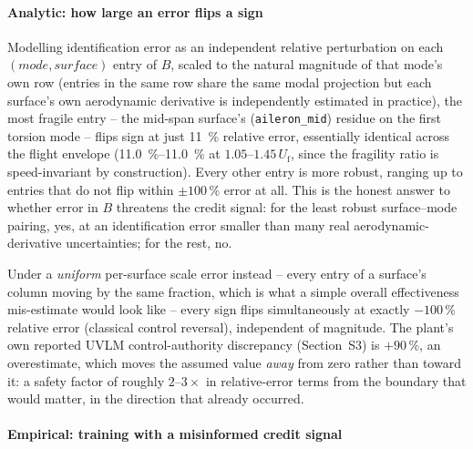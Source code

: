 \documentclass[11pt]{article}
\newcommand{\Uf}{U_{\mathrm{f}}}
\begin{document}
\paragraph{Analytic: how large an error flips a sign}
Modelling identification error as an independent relative perturbation on
each $(mode, surface)$ entry of $B$, scaled to the natural magnitude of
that mode's own row (entries in the same row share the same modal
projection but each surface's own aerodynamic derivative is independently
estimated in practice), the most fragile entry -- the mid-span surface's
(\texttt{aileron\_mid}) residue on the first torsion mode -- flips sign at
just \SI{11}{\percent} relative error, essentially identical across the
flight envelope (\SIrange{11.0}{11.0}{\percent} at $1.05$--$1.45\,\Uf$,
since the fragility ratio is speed-invariant by construction). Every
other entry is more robust, ranging up to entries that do not flip within
$\pm100\,\%$ error at all. This is the honest answer to whether error in
$B$ threatens the credit signal: for the least robust surface--mode
pairing, yes, at an identification error smaller than many real
aerodynamic-derivative uncertainties; for the rest, no.

Under a \emph{uniform} per-surface scale error instead -- every entry of a
surface's column moving by the same fraction, which is what a simple
overall effectiveness mis-estimate would look like -- every sign flips
simultaneously at exactly $-100\,\%$ relative error (classical control
reversal), independent of magnitude. The plant's own reported UVLM
control-authority discrepancy (Section~S3) is $+90\,\%$, an overestimate,
which moves the assumed value \emph{away} from zero rather than toward it:
a safety factor of roughly $2$--$3\times$ in relative-error terms from the
boundary that would matter, in the direction that already occurred.

\paragraph{Empirical: training with a misinformed credit signal}




\end{document}

